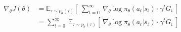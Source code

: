 \begin{align}
\nabla_\theta J(\theta)
&= \mathbb{E}_{\tau \sim p_\theta(\tau)} \left\lbrack\ \sum_{t=0}^{\infty} \ \nabla_\theta\log \pi_\theta(a_t|s_t)\cdot \gamma^t G_t \ \right\rbrack \\
&= \sum_{t=0}^{\infty} \ \mathbb{E}_{\tau \sim p_\theta(\tau)} \left\lbrack\ \nabla_\theta\log \pi_\theta(a_t|s_t)\cdot \gamma^t G_t \ \right\rbrack
\end{align}